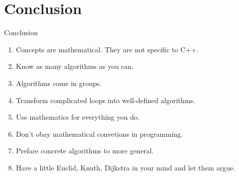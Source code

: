 \documentclass[10pt]{beamer}
\begin{document}
\section{Conclusion}

\begin{frame}{Conclusion}
  \begin{enumerate}
    \item Concepts are mathematical. They are not specific to C++.
    \item Know as many algorithms as you can.
    \item Algorithms come in groups.
    \item Transform complicated loops into well-defined algorithms.
    \item Use mathematics for everything you do.
    \item Don't obay mathematical convetions in programming.
    \item Prefare concrete algorithms to more general.
    \item Have a little Euclid, Knuth, Dijkstra in your mind and let them argue.
  \end{enumerate}
\end{frame}
\end{document}
